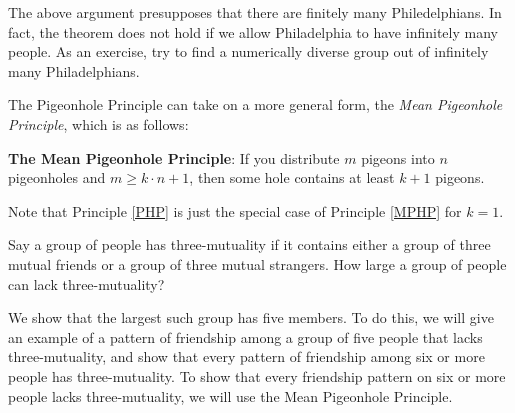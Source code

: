 \begin{aside}
The above argument presupposes that there are finitely many Philedelphians. In fact, the theorem does not hold if we allow Philadelphia to have infinitely many people. As an exercise, try to find a numerically diverse group out of infinitely many Philadelphians. 
\end{aside}

The Pigeonhole Principle can take on a more general form, the \emph{Mean Pigeonhole Principle}, which is as follows:

\begin{principle}\label{MPHP}
\textbf{The Mean Pigeonhole Principle}: If you distribute $m$ pigeons into $n$ pigeonholes and $m\geq k\cdot n +1$, then some hole contains at least $k+1$ pigeons. 
\end{principle}

\begin{aside}
Note that Principle \ref{PHP} is just the special case of Principle \ref{MPHP} for $k=1$.
\end{aside}

\begin{example}
Say a group of people has three-mutuality if it contains either a group of three mutual friends or a group of three mutual strangers. How large a group of people can lack three-mutuality?
\end{example}
We show that the largest such group has five members. To do this, we will give an example of a pattern of friendship among a group of five people that lacks three-mutuality, and show that every pattern of friendship among six or more people has three-mutuality. To show that every friendship pattern on six or more people lacks three-mutuality, we will use the Mean Pigeonhole Principle. 

